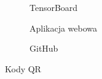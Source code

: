 \begin{figure}[b]
    \centering
    \begin{subfigure}[H]{0.3\textwidth}
        \centering
        
        \caption{TensorBoard}
        \label{fig:tensorboard}
    \end{subfigure}
    \hfill
    \begin{subfigure}[H]{0.3\textwidth}
        \centering
        
        \caption{Aplikacja webowa}
        \label{fig:web-application}
    \end{subfigure}
    \hfill
    \begin{subfigure}[H]{0.3\textwidth}
        \centering
        
        \caption{GitHub}
        \label{fig:github}
    \end{subfigure}
    \caption{Kody QR}
    \label{fig:qr-codes}
\end{figure}
